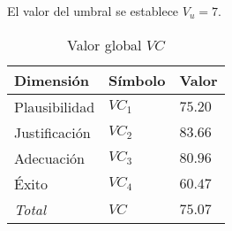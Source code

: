 \documentclass[a4paper,12pt]{article}
\begin{document}
\noindent El valor del umbral se establece $V_u = 7$.

\begin{table}[h]
	\centering
	\begin{tabular}{|l|l|l|}
		\hline
		Dimensión	   & Símbolo & Valor 	 \\ \hline
		Plausibilidad  & $VC_1$  & $75.20$   \\
		Justificación  & $VC_2$  & $83.66$   \\
		Adecuación     & $VC_3$  & $80.96$   \\
		Éxito          & $VC_4$  & $60.47$   \\ \hline
		\textit{Total} & $VC$    & $75.07$   \\ \hline
	\end{tabular}
	\caption{Valor global $VC$}
	\label{tab:total}
\end{table}
\end{document}
